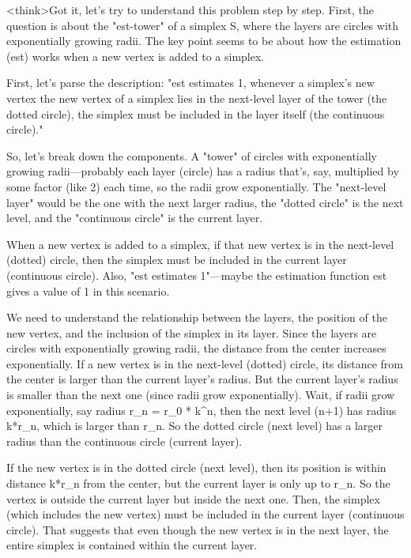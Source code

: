 <think>Got it, let's try to understand this problem step by step. First, the question is about the "est-tower" of a simplex S, where the layers are circles with exponentially growing radii. The key point seems to be about how the estimation (est) works when a new vertex is added to a simplex. 

First, let's parse the description: "est estimates 1, whenever a simplex's new vertex the new vertex of a simplex lies in the next-level layer of the tower (the dotted circle), the simplex must be included in the layer itself (the continuous circle)." 

So, let's break down the components. A "tower" of circles with exponentially growing radii—probably each layer (circle) has a radius that's, say, multiplied by some factor (like 2) each time, so the radii grow exponentially. The "next-level layer" would be the one with the next larger radius, the "dotted circle" is the next level, and the "continuous circle" is the current layer. 

When a new vertex is added to a simplex, if that new vertex is in the next-level (dotted) circle, then the simplex must be included in the current layer (continuous circle). Also, "est estimates 1"—maybe the estimation function est gives a value of 1 in this scenario. 

We need to understand the relationship between the layers, the position of the new vertex, and the inclusion of the simplex in its layer. Since the layers are circles with exponentially growing radii, the distance from the center increases exponentially. If a new vertex is in the next-level (dotted) circle, its distance from the center is larger than the current layer's radius. But the current layer's radius is smaller than the next one (since radii grow exponentially). Wait, if radii grow exponentially, say radius r_n = r_0 * k^n, then the next level (n+1) has radius k*r_n, which is larger than r_n. So the dotted circle (next level) has a larger radius than the continuous circle (current layer). 

If the new vertex is in the dotted circle (next level), then its position is within distance k*r_n from the center, but the current layer is only up to r_n. So the vertex is outside the current layer but inside the next one. Then, the simplex (which includes the new vertex) must be included in the current layer (continuous circle). That suggests that even though the new vertex is in the next layer, the entire simplex is contained within the current layer. 

